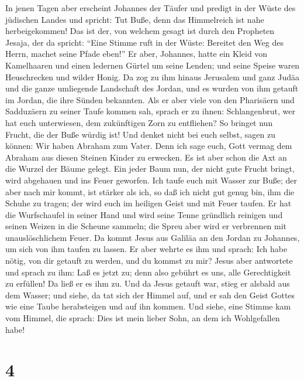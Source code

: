  In jenen Tagen aber erscheint Johannes der Täufer und
predigt in der Wüste des jüdischen Landes  und spricht:
Tut Buße, denn das Himmelreich ist nahe herbeigekommen! 
Das ist der, von welchem gesagt ist durch den Propheten Jesaja, der da
spricht: ``Eine Stimme ruft in der Wüste: Bereitet den Weg des Herrn,
machet seine Pfade eben!''  Er aber, Johannes, hatte ein
Kleid von Kamelhaaren und einen ledernen Gürtel um seine Lenden; und
seine Speise waren Heuschrecken und wilder Honig.  Da zog
zu ihm hinaus Jerusalem und ganz Judäa und die ganze umliegende
Landschaft des Jordan,  und es wurden von ihm getauft im
Jordan, die ihre Sünden bekannten.  Als er aber viele von
den Pharisäern und Sadduzäern zu seiner Taufe kommen sah, sprach er zu
ihnen: Schlangenbrut, wer hat euch unterwiesen, dem zukünftigen Zorn zu
entfliehen?  So bringet nun Frucht, die der Buße würdig
ist!  Und denket nicht bei euch selbst, sagen zu können:
Wir haben Abraham zum Vater. Denn ich sage euch, Gott vermag dem Abraham
aus diesen Steinen Kinder zu erwecken.  Es ist aber schon
die Axt an die Wurzel der Bäume gelegt. Ein jeder Baum nun, der nicht
gute Frucht bringt, wird abgehauen und ins Feuer geworfen.
 Ich taufe euch mit Wasser zur Buße; der aber nach mir
kommt, ist stärker als ich, so daß ich nicht gut genug bin, ihm die
Schuhe zu tragen; der wird euch im heiligen Geist und mit Feuer taufen.
 Er hat die Wurfschaufel in seiner Hand und wird seine
Tenne gründlich reinigen und seinen Weizen in die Scheune sammeln; die
Spreu aber wird er verbrennen mit unauslöschlichem Feuer.
 Da kommt Jesus aus Galiläa an den Jordan zu Johannes, um
sich von ihm taufen zu lassen.  Er aber wehrte es ihm und
sprach: Ich habe nötig, von dir getauft zu werden, und du kommst zu mir?
 Jesus aber antwortete und sprach zu ihm: Laß es jetzt
zu; denn also gebührt es uns, alle Gerechtigkeit zu erfüllen! Da ließ er
es ihm zu.  Und da Jesus getauft war, stieg er alsbald
aus dem Wasser; und siehe, da tat sich der Himmel auf, und er sah den
Geist Gottes wie eine Taube herabsteigen und auf ihn kommen.
 Und siehe, eine Stimme kam vom Himmel, die sprach: Dies
ist mein lieber Sohn, an dem ich Wohlgefallen habe!

\hypertarget{section-3}{%
\section{4}\label{section-3}}

